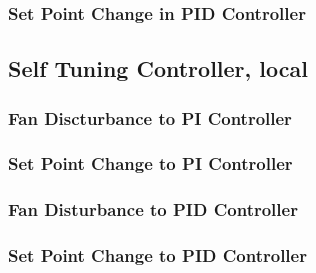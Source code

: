 \subsubsection{Set Point Change in PID Controller}
\begin{code}

\end{code}



\subsection{Self Tuning Controller, local}\label{selfcode_virtual}
\subsubsection{Fan Discturbance to PI Controller}
\begin{code}

\end{code}


\subsubsection{Set Point Change to PI Controller}
\begin{code}

\end{code}

\subsubsection{Fan Disturbance to PID Controller}
\begin{code}

\end{code}

\subsubsection{Set Point Change to PID Controller}
\begin{code}

\end{code}





